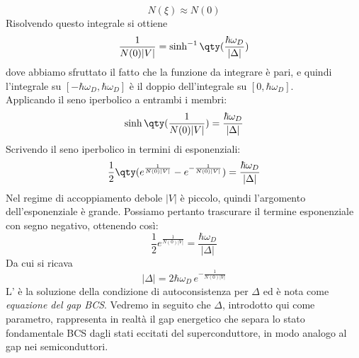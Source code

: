 \begin{equation}
   N(\xi) \approx N(0)
\end{equation}
Risolvendo questo integrale si ottiene
\begin{equation}
   \frac{1}{N(0) |V|}
   =\sinh^{-1} \qty( \frac{\hbar\omega_D}{|\Delta|} )
   \label{eq:BCS_self_consistency_equation}
\end{equation}
dove abbiamo sfruttato il fatto che la funzione da integrare è pari, e quindi l'integrale su $[-\hbar\omega_D, \hbar\omega_D]$ è il doppio dell'integrale su $[0, \hbar\omega_D]$.\\
Applicando il seno iperbolico a entrambi i membri:
\begin{equation*}
   \sinh \qty( \frac{1}{N(0) |V|} )
   =\frac{\hbar\omega_D}{|\Delta|}
\end{equation*}
Scrivendo il seno iperbolico in termini di esponenziali:
\begin{equation*}
   \frac{1}{2} \qty( e^{\frac{1}{N(0) |V|}} - e^{-\frac{1}{N(0) |V|}} )
   =\frac{\hbar\omega_D}{|\Delta|}
\end{equation*}
Nel regime di accoppiamento debole $|V|$ è piccolo, quindi l'argomento dell'esponenziale è grande. Possiamo pertanto trascurare il termine esponenziale con segno negativo, ottenendo così:
\begin{equation*}
   \frac{1}{2} e^{\frac{1}{N(0) |V|}}
   =\frac{\hbar\omega_D}{|\Delta|}
\end{equation*}
Da cui si ricava
\begin{equation}
   |\Delta|
   =2 \hbar\omega_D\, e^{-\frac{1}{N(0) |V|}}
   \label{eq:BCS_gap_equation}
\end{equation}
L' è la soluzione della condizione di autoconsistenza per $\Delta$ ed è nota come \textit{equazione del gap BCS}. Vedremo in seguito che $\Delta$, introdotto qui come parametro, rappresenta in realtà il gap energetico che separa lo stato fondamentale BCS dagli stati eccitati del superconduttore, in modo analogo al gap nei semiconduttori.\\
